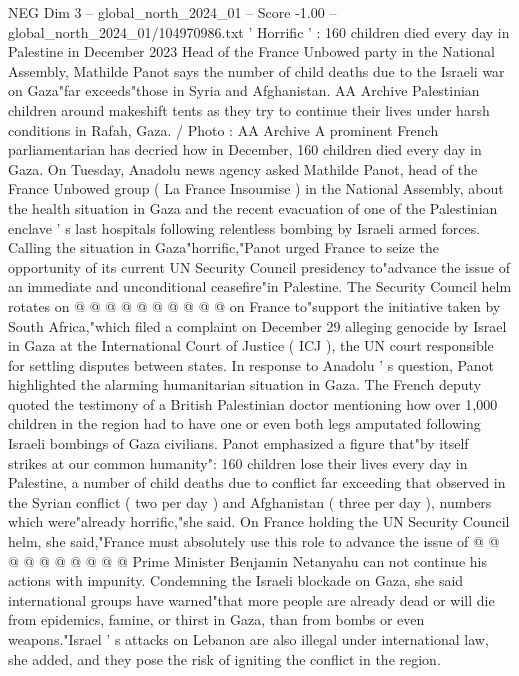 \begin{textsample}{NEG Dim 3 – global\_north\_2024\_01 – Score -1.00 – global\_north\_2024\_01/104970986.txt}  \label{ex:f3_neg_231}
' Horrific ' : 160 children died every day in Palestine in December 2023 Head of the France Unbowed party in the National Assembly, Mathilde Panot says the number of child deaths due to the Israeli war on Gaza"far exceeds"those in Syria and Afghanistan.
AA Archive Palestinian children around makeshift tents as they try to continue their lives under harsh conditions in Rafah, Gaza. / Photo : AA Archive A prominent French parliamentarian has decried how in December, 160 children died every day in Gaza.
On Tuesday, Anadolu news agency asked Mathilde Panot, head of the France Unbowed group ( La France Insoumise ) in the National Assembly, about the health situation in Gaza and the recent evacuation of one of the Palestinian enclave ' s last hospitals following relentless bombing by Israeli armed forces.
Calling the situation in Gaza"horrific,"Panot urged France to seize the opportunity of its current UN Security Council presidency to"advance the issue of an immediate and unconditional ceasefire"in Palestine.
The Security Council helm rotates on @ @ @ @ @ @ @ @ @ @ on France to"support the initiative taken by South Africa,"which filed a complaint on December 29 alleging genocide by Israel in Gaza at the International Court of Justice ( ICJ ), the UN court responsible for settling disputes between states.
In response to Anadolu ' s question, Panot highlighted the alarming humanitarian situation in Gaza.
The French deputy quoted the testimony of a British Palestinian doctor mentioning how over 1,000 children in the region had to have one or even both legs amputated following Israeli bombings of Gaza civilians.
Panot emphasized a figure that"by itself strikes at our common humanity": 160 children lose their lives every day in Palestine, a number of child deaths due to conflict far exceeding that observed in the Syrian conflict ( two per day ) and Afghanistan ( three per day ), numbers which were"already horrific,"she said.
On France holding the UN Security Council helm, she said,"France must absolutely use this role to advance the issue of @ @ @ @ @ @ @ @ @ @ Prime Minister Benjamin Netanyahu can not continue his actions with impunity.
Condemning the Israeli blockade on Gaza, she said international groups have warned"that more people are already dead or will die from epidemics, famine, or thirst in Gaza, than from bombs or even weapons."Israel ' s attacks on Lebanon are also illegal under international law, she added, and they pose the risk of igniting the conflict in the region.

\end{textsample}
